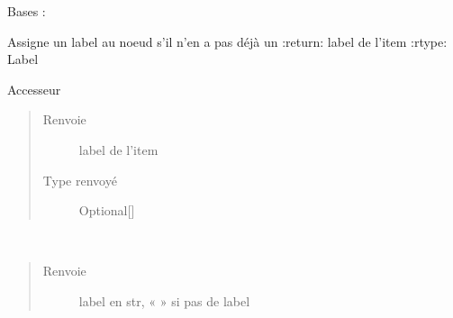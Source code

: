 \documentclass[letterpaper,10pt,french]{sphinxmanual}
\begin{document}
\begin{fulllineitems}
\label{\detokenize{structuresnodes:structuresnodes.StructureNode}}
Bases : {\hyperref[\detokenize{linkedlistnode:linkedlistnode.LinkedListNode}]{}}

\begin{fulllineitems}
\label{\detokenize{structuresnodes:structuresnodes.StructureNode.assignLabel}}
Assigne un label au noeud s’il n’en a pas déjà un
:return: label de l’item
:rtype: Label

\end{fulllineitems}


\begin{fulllineitems}
\label{\detokenize{structuresnodes:structuresnodes.StructureNode.label}}
Accesseur
\begin{quote}\begin{description}
\item[{Renvoie}] \leavevmode
label de l’item

\item[{Type renvoyé}] \leavevmode
Optional{[}{\hyperref[\detokenize{label:label.Label}]{}}{]}

\end{description}\end{quote}

\end{fulllineitems}


\begin{fulllineitems}
\label{\detokenize{structuresnodes:structuresnodes.StructureNode.labelToStr}}~\begin{quote}\begin{description}
\item[{Renvoie}] \leavevmode
label en str, «  » si pas de label


\end{description}
\end{quote}
\end{fulllineitems}
\end{fulllineitems}
\end{document}
